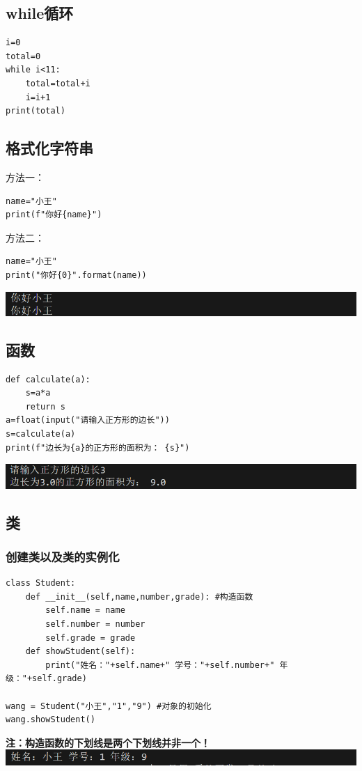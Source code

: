 \documentclass[UTF8,a4paper]{ctexart}
\begin{document}
\subsection{while循环}
\begin{lstlisting}
i=0
total=0
while i<11:
    total=total+i
    i=i+1
print(total)
\end{lstlisting}

\subsection{格式化字符串}
方法一：
\begin{lstlisting}
name="小王"
print(f"你好{name}")
\end{lstlisting}

方法二：
\begin{lstlisting}
name="小王"
print("你好{0}".format(name))
\end{lstlisting}
\includegraphics[width=1\textwidth]{./python/format.png}

\subsection{函数}
\begin{lstlisting}
def calculate(a):
    s=a*a
    return s
a=float(input("请输入正方形的边长"))
s=calculate(a)
print(f"边长为{a}的正方形的面积为： {s}")
\end{lstlisting}
\includegraphics[width=1\textwidth]{./python/function.png}

\subsection{类}
\subsubsection{创建类以及类的实例化}
\begin{lstlisting}
class Student:
    def __init__(self,name,number,grade): #构造函数
        self.name = name
        self.number = number
        self.grade = grade
    def showStudent(self):
        print("姓名："+self.name+" 学号："+self.number+" 年级："+self.grade)

wang = Student("小王","1","9") #对象的初始化
wang.showStudent()
\end{lstlisting}
\textbf{注：构造函数的下划线是两个下划线并非一个！}\\
\includegraphics[width=1\textwidth]{./python/class.png}
\end{document}
